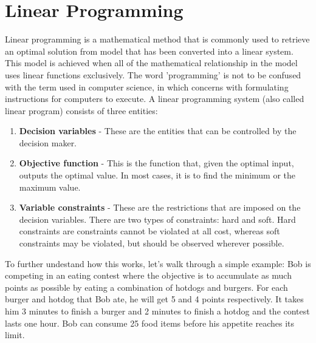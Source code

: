 \documentclass[a4paper, 12pt]{report}
\begin{document}
\section{Linear Programming}
Linear programming is a mathematical method that is commonly used to retrieve an optimal solution from model
that has been converted into a linear system. This model is achieved when all of the mathematical relationship in the model
uses linear functions exclusively. The word 'programming' is not to be confused with the term used in computer science,
in which concerns with formulating instructions for computers to execute. A linear programming system (also called linear
program) consists of three entities:
\begin{enumerate}
\item \textbf{Decision variables} - These are the entities that can be controlled by the decision maker.
\item \textbf{Objective function} - This is the function that, given the optimal input, outputs the optimal value.
In most cases, it is to find the minimum or the maximum value.
\item \textbf{Variable constraints} - These are the restrictions that are imposed on the decision variables. There are two types
of constraints: hard and soft. Hard constraints are constraints cannot be violated at all cost, whereas soft constraints may be
violated, but should be observed wherever possible.
\end{enumerate}
To further undestand how this works, let's walk through a simple example: Bob is competing in
an eating contest where the objective is to accumulate as much points as possible by eating a combination of hotdogs and burgers.
For each burger and hotdog that Bob ate, he will get 5 and 4 points respectively. It takes him 3 minutes to finish a burger and
2 minutes to finish a hotdog and the contest lasts one hour. Bob can consume 25 food items before his appetite reaches its limit.
\end{document}
